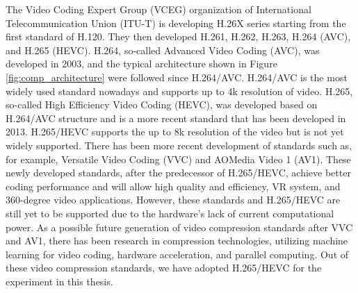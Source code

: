 The Video Coding Expert Group (VCEG) organization of International Telecommunication Union (ITU-T) is developing H.26X series starting from the first standard of H.120. They then developed H.261, H.262, H.263, H.264 (AVC), and H.265 (HEVC). H.264, so-called Advanced Video Coding (AVC), was developed in 2003, and the typical architecture shown in Figure \ref{fig:comp_architecture} were followed since H.264/AVC. H.264/AVC is the most widely used standard nowadays and supports up to 4k resolution of video. H.265, so-called High Efficiency Video Coding (HEVC), was developed based on H.264/AVC structure and is a more recent standard that has been developed in 2013. H.265/HEVC supports the up to 8k resolution of the video but is not yet widely supported. There has been more recent development of standards such as, for example, Versatile Video Coding (VVC) and AOMedia Video 1 (AV1). These newly developed standards, after the predecessor of H.265/HEVC, achieve better coding performance and will allow high quality and efficiency, VR system, and 360-degree video applications. However, these standards and H.265/HEVC are still yet to be supported due to the hardware's lack of current computational power. As a possible future generation of video compression standards after VVC and AV1, there has been research in compression technologies, utilizing machine learning for video coding, hardware acceleration, and parallel computing. Out of these video compression standards, we have adopted H.265/HEVC for the experiment in this thesis.